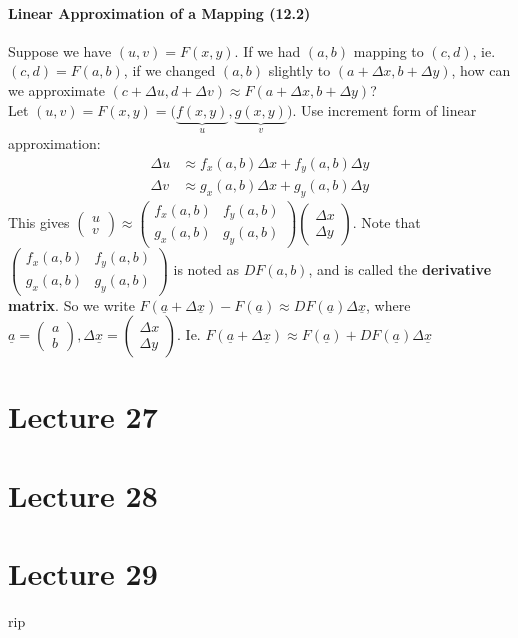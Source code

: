 \documentclass[tikz,10pt,letter]{article}
\theoremstyle{plain}
\theoremstyle{definition}
\begin{document}
\paragraph{Linear Approximation of a Mapping (12.2)}
Suppose we have $(u,v)=F(x,y)$. If we had $(a,b)$ mapping to $(c,d)$, ie. $(c,d)=F(a,b)$, if we changed $(a,b)$ slightly to $(a+\Delta x,b+\Delta y)$, how can we approximate $(c+\Delta u,d+\Delta v)\approx F(a+\Delta x,b+\Delta y)$? \\ 
Let $(u,v)=F(x,y)=\big(\underbrace{f(x,y)}_{u},\underbrace{g(x,y)}_v\big)$. Use increment form of linear approximation: \begin{align*}\Delta u&\approx f_x(a,b)\Delta x+f_y(a,b)\Delta y\\\Delta v&\approx g_x(a,b)\Delta x+g_y(a,b)\Delta y\end{align*} 
This gives $\begin{pmatrix}u\\v\end{pmatrix}\approx\begin{pmatrix}f_x(a,b)&f_y(a,b)\\g_x(a,b)&g_y(a,b)\end{pmatrix}\begin{pmatrix}\Delta x\\\Delta y\end{pmatrix}$. Note that $\begin{pmatrix}f_x(a,b)&f_y(a,b)\\g_x(a,b)&g_y(a,b)\end{pmatrix}$ is noted as $DF(a,b)$, and is called the \textbf{derivative matrix}. So we write $F(\underline{a}+\Delta\underline{x})-F(\underline{a})\approx DF(\underline{a})\Delta\underline{x}$, where $\underline{a}=\begin{pmatrix}a\\b\end{pmatrix},\Delta\underline{x}=\begin{pmatrix}\Delta x\\\Delta y\end{pmatrix}$. Ie. $F(\underline{a}+\Delta \underline{x})\approx F(\underline{a})+DF(\underline{a})\Delta \underline{x}$

\section*{Lecture 27}
\section*{Lecture 28}
\section*{Lecture 29}
rip
\end{document}

